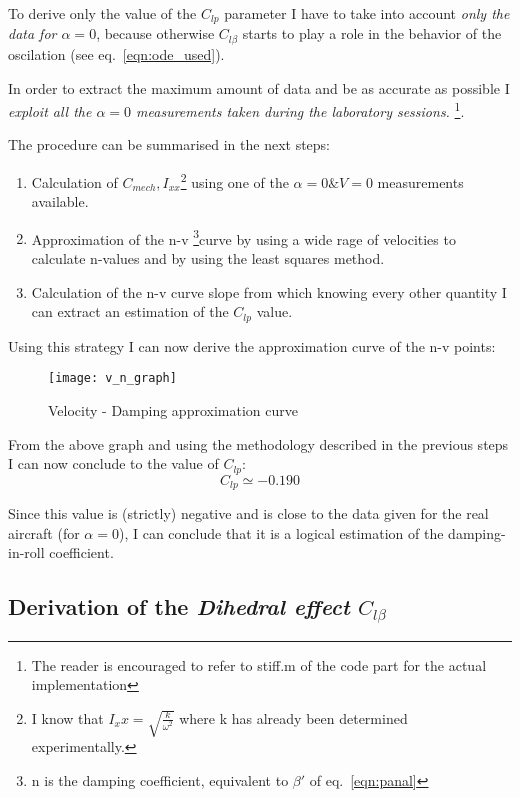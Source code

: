 To derive only the value of the $C_{lp}$ parameter I have to take into account \textit{only the data for $\alpha = 0$},
because otherwise $C_{l\beta}$ starts to play a role in the behavior of the oscilation (see eq.~\ref{eqn:ode_used}).

In order to extract the maximum amount of data and be as accurate as possible I \textit{exploit all the $\alpha = 0$ measurements taken during the laboratory sessions.}
\footnote{The reader is encouraged to refer to stiff.m of the code part for the actual implementation}.

The procedure can be summarised in the next steps:
\begin{enumerate}
    \item Calculation of $C_{mech}, I_{xx}$\footnote{I know that $I_xx = \sqrt{\frac{k}{\omega^2}}$ where k
    has already been determined experimentally.} using one of the  $\alpha = 0 \& V = 0$ measurements available.
    \item Approximation of the n-v \footnote{n is the damping coefficient, equivalent to $\beta'$ of eq.~\ref{eqn:panal}}curve by using a wide rage of velocities to calculate n-values and by using the least squares method.
    \item Calculation of the n-v  curve slope from which knowing every other quantity I can extract an estimation of the $C_{lp}$ value.
\end{enumerate}

Using this strategy I can now derive the approximation curve of the n-v points:
\begin{figure}[H]
    \begin{center}
        \texttt{[image: v\_n\_graph]} %
    \end{center}
    \caption{Velocity - Damping approximation curve}
    \label{fig:v_n_graph}
\end{figure}

\noindent From the above graph and using the methodology described in the previous steps I can now conclude to the value of $C_{lp}$:
\begin{equation}
    C_{lp} \simeq -0.190
\end{equation}

\noindent Since this value is (strictly) negative and is close to the data given for the real aircraft (for $\alpha = 0$), 
I can conclude that it is a logical estimation of the damping-in-roll coefficient.

\subsection{Derivation of the \textit{Dihedral effect} $C_{l\beta}$}
